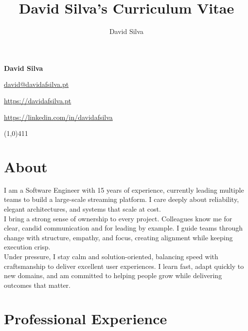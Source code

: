 \documentclass[10pt]{article}
\title{David Silva's Curriculum Vitae}
\author{David Silva}
\begin{document}
\begin{minipage}[ht]{0.46\textwidth}
	\Huge{\textbf{David Silva}}
\end{minipage}
\begin{minipage}[ht]{0.46\textwidth}
\hfill \href{mailto:david@davidafsilva.pt}{david@davidafsilva.pt}

\hfill \url{https://davidafsilva.pt}

\hfill \url{https://linkedin.com/in/davidafsilva}

\end{minipage}

\line(1,0){411}

\section*{About}
I am a Software Engineer with 15 years of experience, currently leading multiple teams to build a large-scale streaming platform. I care deeply about reliability, elegant architectures, and systems that scale at cost.\\
I bring a strong sense of ownership to every project. Colleagues know me for clear, candid communication and for leading by example. I guide teams through change with structure, empathy, and focus, creating alignment while keeping execution crisp.\\
Under pressure, I stay calm and solution-oriented, balancing speed with craftsmanship to deliver excellent user experiences. I learn fast, adapt quickly to new domains, and am committed to helping people grow while delivering outcomes that matter.

\section*{Professional Experience}
\end{document}
